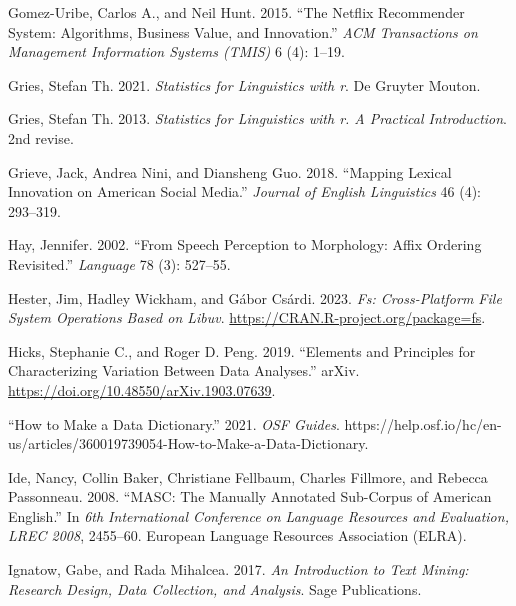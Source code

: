\documentclass[
  letterpaper,
  DIV=11,
  numbers=noendperiod]{scrreport}
\newlength{\cslhangindent}
\newlength{\cslentryspacingunit} %
\newenvironment{CSLReferences}[2] %
 {%
  \setlength{\parindent}{0pt}
  \ifodd #1
  \let\oldpar\par
  \def\par{\hangindent=\cslhangindent\oldpar}
  \fi
  \setlength{\parskip}{#2\cslentryspacingunit}
 }%
 {}
\theoremstyle{definition}
\theoremstyle{remark}
\begin{document}
\begin{CSLReferences}{1}{0}
\leavevmode{}%
Gomez-Uribe, Carlos A., and Neil Hunt. 2015. {``The Netflix Recommender
System: Algorithms, Business Value, and Innovation.''} \emph{ACM
Transactions on Management Information Systems (TMIS)} 6 (4): 1--19.

\leavevmode{}%
Gries, Stefan Th. 2021. \emph{Statistics for Linguistics with r}. De
Gruyter Mouton.

\leavevmode{}%
Gries, Stefan Th. 2013. \emph{Statistics for Linguistics with r. A
Practical Introduction}. 2nd revise.

\leavevmode{}%
Grieve, Jack, Andrea Nini, and Diansheng Guo. 2018. {``Mapping Lexical
Innovation on American Social Media.''} \emph{Journal of English
Linguistics} 46 (4): 293--319.

\leavevmode{}%
Hay, Jennifer. 2002. {``From Speech Perception to Morphology: Affix
Ordering Revisited.''} \emph{Language} 78 (3): 527--55.

\leavevmode{}%
Hester, Jim, Hadley Wickham, and Gábor Csárdi. 2023. \emph{Fs:
Cross-Platform File System Operations Based on Libuv}.
\url{https://CRAN.R-project.org/package=fs}.

\leavevmode{}%
Hicks, Stephanie C., and Roger D. Peng. 2019. {``Elements and Principles
for Characterizing Variation Between Data Analyses.''} arXiv.
\url{https://doi.org/10.48550/arXiv.1903.07639}.

\leavevmode{}%
{``How to Make a Data Dictionary.''} 2021. \emph{OSF Guides}.
https://help.osf.io/hc/en-us/articles/360019739054-How-to-Make-a-Data-Dictionary.

\leavevmode{}%
Ide, Nancy, Collin Baker, Christiane Fellbaum, Charles Fillmore, and
Rebecca Passonneau. 2008. {``MASC: The Manually Annotated Sub-Corpus of
American English.''} In \emph{6th International Conference on Language
Resources and Evaluation, LREC 2008}, 2455--60. European Language
Resources Association (ELRA).

\leavevmode{}%
Ignatow, Gabe, and Rada Mihalcea. 2017. \emph{An Introduction to Text
Mining: Research Design, Data Collection, and Analysis}. Sage
Publications.


\end{CSLReferences}
\end{document}
